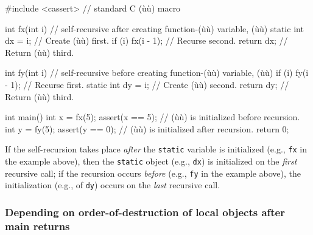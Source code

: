 \begin{emcppshiddenlisting}[emcppsbatch=e2]
#include <cassert>  // standard C (ù{}ù) macro
\end{emcppshiddenlisting}
\begin{emcppslisting}[emcppsbatch=e2]
int fx(int i)  // self-recursive after creating function-(ù{}ù) variable, (ù{}ù)
{
    static int dx = i;     // Create (ù{}ù) first.
    if (i) { fx(i - 1); }  // Recurse second.
    return dx;             // Return (ù{}ù) third.
}

int fy(int i)  // self-recursive before creating function-(ù{}ù) variable, (ù{}ù)
{
    if (i) { fy(i - 1); }  // Recurse first.
    static int dy = i;     // Create (ù{}ù) second.
    return dy;             // Return (ù{}ù) third.
}

int main()
{
    int x = fx(5);  assert(x == 5);  // (ù{}ù) is initialized before recursion.
    int y = fy(5);  assert(y == 0);  // (ù{}ù) is initialized after recursion.
    return 0;
}
\end{emcppslisting}

\noindent If the self-recursion takes place \emph{after} the \lstinline!static!
variable is initialized (e.g., \lstinline!fx! in the example above), then the
\lstinline!static! object (e.g., \lstinline!dx!) is initialized on the
\emph{first} recursive call; if the recursion occurs \emph{before}
(e.g., \lstinline!fy! in the example above), the initialization (e.g., of \lstinline!dy!)
occurs on the \emph{last} recursive call.


\subsubsection[Depending on order-of-destruction of local objects after \lstinline!main! returns]{Depending on order-of-destruction of local objects after {\SubsubsecCode main} returns}\label{depending-on-order-of-destruction-of-local-objects-after-main-returns}

